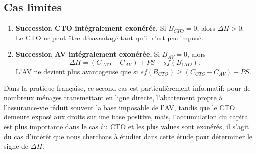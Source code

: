 \subsection{Cas limites}
\label{sec:cas_limites}

\begin{enumerate}
    \item \textbf{Succession CTO intégralement exonérée.} Si \(B_{CTO} = 0\), alors \(\Delta H > 0\). Le CTO ne peut être désavantagé tant qu'il n'est pas imposé.
    \item \textbf{Succession AV intégralement exonérée.} Si \(B_{AV} = 0\), alors
    \begin{equation}
        \Delta H = (C_{CTO} - C_{AV}) + PS - s f(B_{CTO}).
    \end{equation}
    L'AV ne devient plus avantageuse que si \(s f(B_{CTO}) \geq (C_{CTO} - C_{AV}) + PS\).
\end{enumerate}

Dans la pratique française, ce second cas est particulièrement informatif: pour de nombreux ménages transmettant en ligne directe, l'abattement propre à l'assurance-vie réduit souvent la base imposable de l'AV, tandis que le CTO demeure exposé aux droits sur une base positive, mais, l'accumulation du capital est plus importante dans le cas du CTO et les plus values sont exonérés, il s'agit du cas d'intérêt que nous cherchons à étudier dans cette étude pour déterminer le signe de \(\Delta H\).
